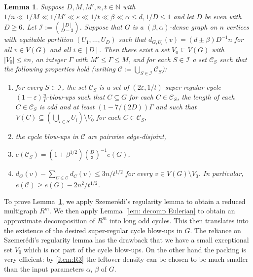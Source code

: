 \documentclass[a4paper, 11pt, reqno]{amsart}
\newtheorem{lemma}[definition]{Lemma}
\numberwithin{equation}{section}
\newcommand{\1}{{\rm 1\hspace*{-0.4ex}%
\rule{0.1ex}{1.52ex}\hspace*{0.2ex}}}
\newcommand{\N}{\mathbb N}
\newcommand{\cC}{\mathcal{C}}
\newcommand{\cI}{\mathcal{I}}
\renewcommand{\epsilon}{\varepsilon}
\newcommand{\sm}{\setminus}
\newcommand{\sub}{\subseteq}
\begin{document}
\begin{lemma}\label{lem: decomp blow ups}
Suppose $D,M,M',n,t\in \N$ with $1/n \ll 1/M\ll 1/M'\ll\epsilon\ll 1/t \ll \beta \ll \alpha \leq d,1/D\leq 1$ and let $D$ be even with $D\geq 6$. 
Let $\cI:= \binom{[D]}{D-3}$.
Suppose that $G$ is a $(\beta,\alpha)$-dense graph on $n$ vertices
with equitable partition $(U_1,\dots, U_D)$ such that $d_{G,U_i}(v) = (d \pm \beta)D^{-1}n$ for all $v\in V(G)$ and all $i\in [D]$. 
Then there exist a set $V_0\sub V(G)$ with $|V_0|\leq \epsilon n$, an integer $\Gamma$ with $M' \leq \Gamma \leq M$, and 
for each $S\in \cI$ a set $\cC_{S}$ such that the following properties hold (writing $\cC:=\bigcup_{S\in \cI}\cC_S$):
\begin{enumerate}[label=(R\arabic*)]
	\item\label{item:R1} for every $S\in \cI$, 
	the set $\cC_{S} $ is a set of $(2\epsilon,1/t)$-super-regular cycle $(1- \epsilon)\frac{n}{\Gamma}$-blow-ups
	such that $C\sub G$ for each $C\in \cC_S$,
	the length of each $C\in \cC_S$ is odd and at least $(1- {7}/{(2D)})\Gamma$
	and such that $V(C)\sub (\bigcup_{i\in S}U_i)\sm V_0$ for each $C\in \cC_S$,
	\item\label{item:R2a} the cycle blow-ups in $\cC$ are pairwise edge-disjoint,
	\item\label{item:R2} $e(\cC_S) = (1\pm \beta^{1/2})\binom{D}{3}^{-1} e(G)$,
	\item\label{item:R3} 	$d_G(v)-\sum_{C\in\cC}d_{C}(v)\leq 3n/t^{1/2}$ for every $v\in V(G)\sm V_0$. 
	In particular, $ e(\cC)\geq e(G) - 2n^2/t^{1/2}$.
\end{enumerate}
\end{lemma}
To prove Lemma~\ref{lem: decomp blow ups}, we apply Szemer\'{e}di's regularity lemma to obtain a reduced multigraph $R^m$. We then apply Lemma~\ref{lem: decomp Eulerian} to obtain an approximate decomposition of $R^m$ into long odd cycles. This then translates into the existence of the desired super-regular cycle blow-ups in $G$. The reliance on Szemer\'{e}di's regularity lemma has the drawback that we have a small exceptional set $V_0$ which is not part of the cycle blow-ups. On the other hand the packing is very efficient: by \ref{item:R3} the leftover density can be chosen to be much smaller than the input parameters $\alpha$, $\beta$ of $G$. 
\end{document}
